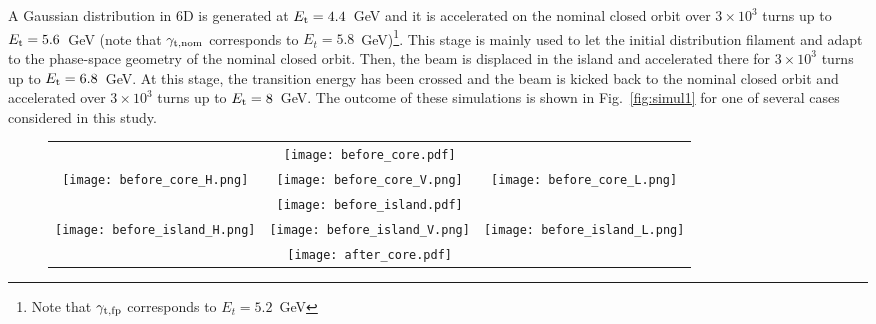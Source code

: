 \documentclass{article}
\begin{document}
A Gaussian distribution in 6D is generated at $E_{\rm t} =4.4$~GeV and it is accelerated on the nominal closed orbit over $3\times 10^3$ turns up to $E_{\rm t}=5.6$~GeV (note that $\gamma_{\rm t, nom}$ corresponds to $E_{t}=5.8$~GeV)\footnote{Note that $\gamma_{\rm t, fp}$ corresponds to $E_{t}=5.2$~GeV}. This stage is mainly used to let the initial distribution filament and adapt to the phase-space geometry of the nominal closed orbit. Then, the beam is displaced in the island and accelerated there for $3\times 10^3$ turns up to $E_{\rm t}=6.8$~GeV. At this stage, the transition energy has been crossed and the beam is kicked back to the nominal closed orbit and accelerated over $3\times 10^3$ turns up to $E_{\rm t}=8$~GeV. The outcome of these simulations is shown in Fig.~\ref{fig:simul1} for one of several cases considered in this study. 
%
\begin{figure}[p]
\centering
    \begin{tabular}{ccc}
  \multicolumn{3}{c}{\texttt{[image: before\_core.pdf]}} \\
  \hspace{8truemm} \texttt{[image: before\_core\_H.png]} &
  \hspace{4truemm} \texttt{[image: before\_core\_V.png]} &
  \hspace{0truemm} \texttt{[image: before\_core\_L.png]} \\
  \multicolumn{3}{c}{\texttt{[image: before\_island.pdf]}} \\
  \hspace{8truemm} \texttt{[image: before\_island\_H.png]} &
  \hspace{4truemm} \texttt{[image: before\_island\_V.png]} &
  \hspace{0truemm} \texttt{[image: before\_island\_L.png]} \\
  \multicolumn{3}{c}{\texttt{[image: after\_core.pdf]}} \\

\end{tabular}
\end{figure}
\end{document}
